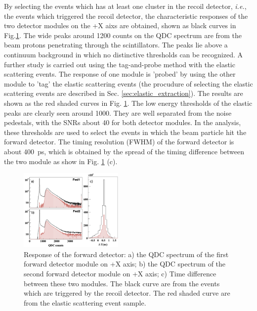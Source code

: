 \documentclass[number,5p]{elsarticle}
\begin{document}
By selecting the events which has at least one cluster in the recoil
detector, \textit{i.e.}, the events which triggered the recoil detector, the
characteristic responses of the two detector modules on the +X aixs are
obtained, shown as black curves in Fig.\ref {fig:fwd_performance}.
The wide peaks around \num{1200} counts on the QDC spectrum are from the beam protons
penetrating through the scintillators.
The peaks lie above a continuum background in which no distinctive thresholds can be recognized.
A further study is carried out using the tag-and-probe method with the elastic
scattering events.
The response of one module is 'probed' by using the other module to 'tag' the
elastic scattering events (the procudure of selecting the elastic scattering events are described in Sec. \ref{sec:elastic_extraction}).
The results are shown as the red shaded curves in Fig. \ref{fig:fwd_performance}.
The low energy thresholds of the elastic peaks are clearly seen around \num{1000}.
They are well separated from the noise pedestals, with the SNRs about \num{40} for both detector modules.
In the analysis, these thresholds are used to select the events in which the beam particle hit the forward detector.
The timing resolution (FWHM) of the forward detector is about \SI{400}{ps}, which is obtained by the spread of the timing difference between the two module as show in Fig. \ref{fig:fwd_performance} (c).
\begin{figure}[htb!]
  \centering
  \includegraphics[width=0.45\textwidth]{./fwd_performance_elastic.png}
  \caption{Response of the forward detector: a) the QDC spectrum of the first forward detector module on +X axis;
    b) the QDC spectrum of the second forward detector module on +X axis; c) Time difference between these two modules.
    The black curve are from the events which are triggered by the recoil
    detector.
    The red shaded curve are from the elastic scattering event sample.
  }
  \label{fig:fwd_performance}
\end{figure}
\end{document}
